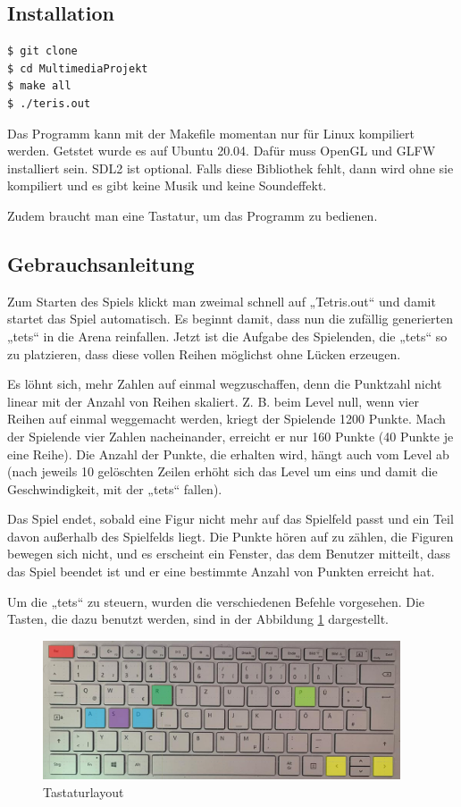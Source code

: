 \documentclass[11pt]{article}
\begin{document}
\subsection{Installation}

\begin{lstlisting}[language=bash]
$ git clone 
$ cd MultimediaProjekt
$ make all
$ ./teris.out
\end{lstlisting}

Das Programm kann mit der Makefile momentan nur für Linux kompiliert werden. Getstet wurde es auf Ubuntu 20.04. 
Dafür muss OpenGL und GLFW installiert sein. SDL2 ist optional. Falls diese Bibliothek fehlt, 
dann wird ohne sie kompiliert und es gibt keine Musik und keine Soundeffekt.

Zudem braucht man eine Tastatur, um das Programm zu bedienen.

\subsection{Gebrauchsanleitung} \label{geb}
Zum Starten des Spiels klickt man zweimal schnell auf „Tetris.out“ und damit startet das Spiel automatisch.  
Es beginnt damit, dass nun die zufällig generierten „\glspl {tet}“ in die Arena reinfallen. Jetzt ist die Aufgabe des Spielenden, die „\glspl {tet}“ so zu platzieren, dass diese vollen Reihen möglichst ohne Lücken erzeugen. 


Es löhnt sich, mehr Zahlen auf einmal wegzuschaffen, denn die Punktzahl nicht linear mit der Anzahl von Reihen skaliert.  Z. B. beim Level null, wenn vier Reihen auf einmal weggemacht werden, kriegt der Spielende 1200 Punkte. Mach der Spielende vier Zahlen nacheinander, erreicht er nur 160 Punkte (40 Punkte je eine Reihe). 
Die Anzahl der Punkte, die erhalten wird, hängt auch vom Level ab (nach jeweils 10 gelöschten Zeilen erhöht sich das Level um eins und damit die Geschwindigkeit, mit der „\glspl {tet}“ fallen).

Das Spiel endet, sobald eine Figur nicht mehr auf das Spielfeld passt und ein Teil davon außerhalb des Spielfelds liegt. Die Punkte hören auf zu zählen, die Figuren bewegen sich nicht, und es erscheint ein Fenster, das dem Benutzer mitteilt, dass das Spiel beendet ist und er eine bestimmte Anzahl von Punkten erreicht hat.

Um die „\glspl {tet}“ zu steuern, wurden die verschiedenen Befehle vorgesehen. Die Tasten, die dazu benutzt werden, sind in der Abbildung \ref{tat} dargestellt.

\begin{figure}[h]
  \centering
  \includegraphics[width=400px]{../images/keyboard.jpg}
  \caption{Tastaturlayout}
  \label{tat}
\end{figure}
\end{document}
